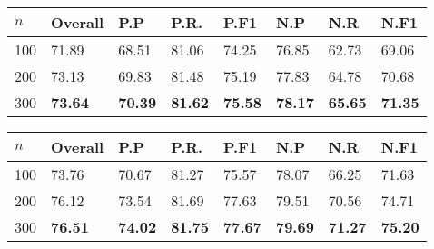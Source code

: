 \documentclass{acm_proc_article-sp}
\begin{document}
\vspace{-3mm}
\tabcolsep=0.11cm
\begin{tabular}{| l | l | l | l | l | l | l | l |}
\hline
$n$ & Overall & P.P & P.R. & P.F1 & N.P & N.R & N.F1 \\ \hline
100 & 71.89 & 68.51 & 81.06 & 74.25 & 76.85 & 62.73 & 69.06 \\ \hline
200 & 73.13 & 69.83 & 81.48 & 75.19 & 77.83 & 64.78 & 70.68 \\ \hline
300 & \bf{73.64} & \bf{70.39} & \bf{81.62} & \bf{75.58} & \bf{78.17} & \bf{65.65} & \bf{71.35} \\ \hline
\end{tabular}

\vspace{-3mm}
\tabcolsep=0.11cm
\begin{tabular}{| l | l | l | l | l | l | l | l |}
\hline
$n$ & Overall & P.P & P.R. & P.F1 & N.P & N.R & N.F1 \\ \hline
100 & 73.76 & 70.67 & 81.27 & 75.57 & 78.07 & 66.25 & 71.63 \\ \hline
200 & 76.12 & 73.54 & 81.69 & 77.63 & 79.51 & 70.56 & 74.71\\ \hline
300 & \bf{76.51} & \bf{74.02} & \bf{81.75} & \bf{77.67} & \bf{79.69} & \bf{71.27} & \bf{75.20} \\ \hline
\end{tabular} 
\end{document}
